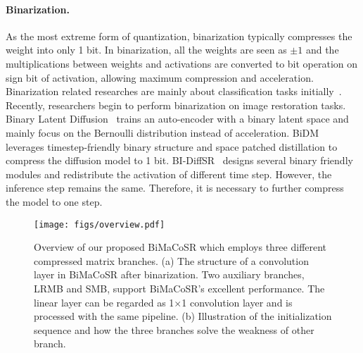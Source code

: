 \paragraph{Binarization.} 
As the most extreme form of quantization, binarization typically compresses the weight into only 1 bit.
In binarization, all the weights are seen as $\pm 1$ and the multiplications between weights and activations are converted to bit operation on sign bit of activation, allowing maximum compression and acceleration.
Binarization related researches are mainly about classification tasks initially~\cite{rastegari2016xnor,liu2020reactnet,qin2020forward,qin2022distribution}.
Recently, researchers begin to perform binarization on image restoration tasks.
Binary Latent Diffusion~\cite{wang2023binary} trains an auto-encoder with a binary latent space and mainly focus on the Bernoulli distribution instead of acceleration.
BiDM~\cite{zheng2024bidm} leverages timestep-friendly binary structure and space patched distillation to compress the diffusion model to 1 bit.
BI-DiffSR~\cite{chen2024binarized} designs several binary friendly modules and redistribute the activation of different time step.
However, the inference step remains the same.
Therefore, it is necessary to further compress the model to one step.


\begin{figure*}[t!]
    \centering
    \texttt{[image: figs/overview.pdf]}
    \vspace{-7mm}
    \caption{Overview of our proposed BiMaCoSR which employs three different compressed matrix branches. (a) The structure of a convolution layer in BiMaCoSR after binarization. Two auxiliary branches, \ie LRMB and SMB, support BiMaCoSR's excellent performance. The linear layer can be regarded as 1$\times$1 convolution layer and is processed with the same pipeline. (b) Illustration of the initialization sequence and how the three branches solve the weakness of other branch. 
}
    \label{fig:method-overview}
    \vspace{-4.5mm}
\end{figure*}